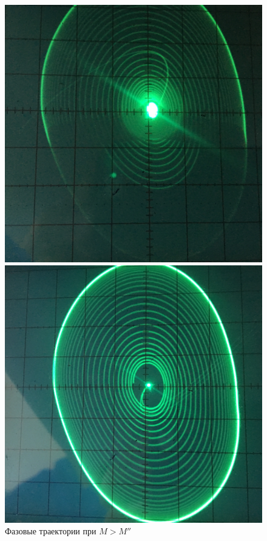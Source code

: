 \begin{figure}[h!]
	\centering
	\begin{minipage}{0.32\linewidth}
	\includegraphics[width=\linewidth]{photo/task2c(rights).jpg}
	\end{minipage}
	\begin{minipage}{0.32\linewidth}
	\includegraphics[width=\linewidth]{photo/task2c(rightm).jpg}
	\end{minipage}
	\caption{Фазовые траектории при $M>M''$}
	\label{fig11}
\end{figure}
